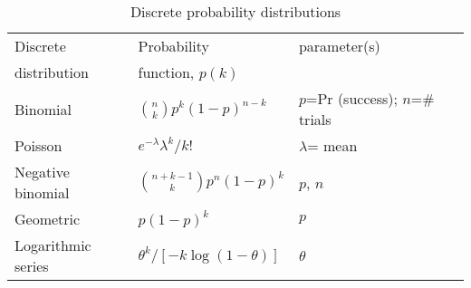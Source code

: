 \begin{table}[htbp]%
\caption{Discrete probability distributions\label{tab:distns}}%
\medskip
\small
\centering
\begin{tabular}{lll}\hline
Discrete     & Probability  & parameter(s)  \\ 
distribution & function, $p(k)$  
\\ \hline
%
Binomial & $\binom nk p^k(1-p)^{n-k}$ & \brk{$p$=Pr (success);\\ $n$=\# trials} \\[1ex] 
Poisson & $e^{-\lambda }\lambda ^k/k!$ & $\lambda$= mean  \\[1ex] 
Negative binomial & $\binom{n+k-1}kp^n(1-p)^k$ &  $p$, $n$  \\[1ex] 
Geometric & $p(1-p)^k$ &  $p$  \\[1ex]
Logarithmic series & $\theta ^k/[-k\log (1-\theta )]$ &  $\theta$ \\[1ex] \hline
\end{tabular}
\end{table}%

